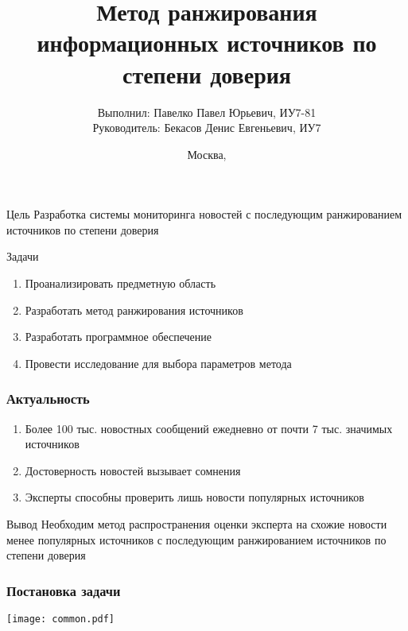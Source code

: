 \documentclass[hyperref={unicode}, 14pt, aspectratio=169]{beamer}
\title[]{Метод ранжирования информационных источников по степени доверия}
\author[Павелко Павел Юрьевич]{Выполнил: Павелко Павел Юрьевич, ИУ7-81 \\ Руководитель: Бекасов Денис Евгеньевич, ИУ7}
\institute[]{МГТУ им. Баумана}
\date{Москва, \the\year}
\begin{document}
\begin{frame}
  \titlepage
\end{frame}

\begin{frame}
    \begin{block}{Цель}
        Разработка системы мониторинга новостей с последующим ранжированием источников по степени доверия
    \end{block}

    \begin{block}{Задачи}
        \begin{enumerate}
            \item Проанализировать предметную область
            \item Разработать метод ранжирования источников
            \item Разработать программное обеспечение
            \item Провести исследование для выбора параметров метода
        \end{enumerate}
    \end{block}
\end{frame}

\begin{frame}
    \frametitle{Актуальность}

    \begin{block}{}
        \begin{enumerate}
            \item Более 100 тыс. новостных сообщений ежедневно от почти 7 тыс. значимых источников
            \item Достоверность новостей вызывает сомнения
            \item Эксперты способны проверить лишь новости популярных источников
        \end{enumerate}
    \end{block}

    \begin{block}{Вывод}
        Необходим метод распространения оценки эксперта на схожие новости менее популярных источников с последующим ранжированием источников по степени доверия
    \end{block}
\end{frame}

\begin{frame}
    \frametitle{Постановка задачи}

    \begin{center}
        \texttt{[image: common.pdf]}
    \end{center}
\end{frame}
\end{document}
